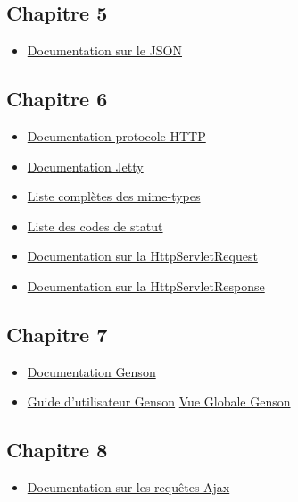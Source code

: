 \documentclass{article}[12pt]
\begin{document}
\subsection{Chapitre 5}
\begin{itemize}
	\item \href{http://json.org}{Documentation sur le JSON} 
\end{itemize}
\subsection{Chapitre 6}
\begin{itemize}
	\item  \href{https://tools.ietf.org/html/rfc2616}{Documentation protocole HTTP}
    \item \href{http://www.eclipse.org/jetty/}{Documentation Jetty}
    \item \href{https://www.sitepoint.com/web-foundations/mime-types-complete-list/}{Liste complètes des mime-types}
    \item \href{https://www.w3.org/Protocols/rfc2616/rfc2616-sec10.html}{Liste des codes de statut}
    \item \href{http://docs.oracle.com/javaee/7/api/javax/servlet/http/HttpServletRequest.html}{Documentation sur la HttpServletRequest}
    \item \href{http://docs.oracle.com/javaee/7/api/javax/servlet/http/HttpServletResponse.html}{Documentation sur la HttpServletResponse}
\end{itemize}
\subsection{Chapitre 7}
\begin{itemize}
	\item \href{http://owlike.github.io/genson/}{Documentation Genson}
    \item \href{http://owlike.github.io/genson/Documentation/UserGuide/}{Guide d'utilisateur Genson}
    \href{http://owlike.github.io/genson/Documentation/Javadoc/}{Vue Globale Genson}
\end{itemize}
\subsection{Chapitre 8}
\begin{itemize}
	\item \href{http://api.jquery.com/jquery.ajax/}{Documentation sur les requêtes Ajax} 
\end{itemize}
\end{document}
